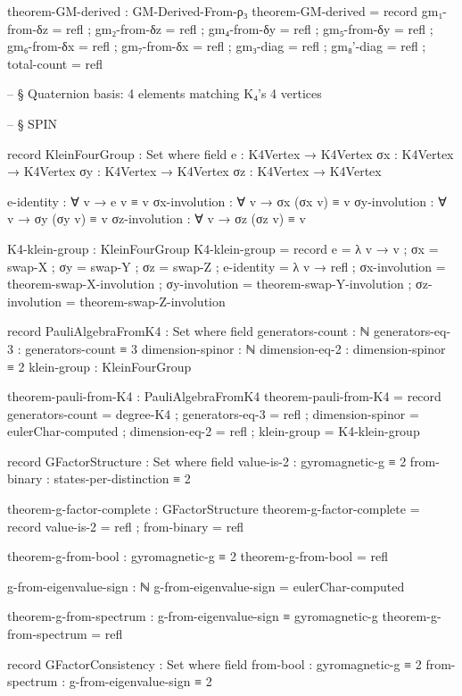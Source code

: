 \documentclass[11pt,a4paper]{book}
\begin{document}
\begin{code}
theorem-GM-derived : GM-Derived-From-ρ₃
theorem-GM-derived = record
  { gm₁-from-δz  = refl
  ; gm₂-from-δz  = refl
  ; gm₄-from-δy  = refl
  ; gm₅-from-δy  = refl
  ; gm₆-from-δx  = refl
  ; gm₇-from-δx  = refl
  ; gm₃-diag     = refl
  ; gm₈'-diag    = refl
  ; total-count   = refl
  }

-- § Quaternion basis: 4 elements matching K₄'s 4 vertices


-- § SPIN

record KleinFourGroup : Set where
  field
    e  : K4Vertex → K4Vertex
    σx : K4Vertex → K4Vertex
    σy : K4Vertex → K4Vertex
    σz : K4Vertex → K4Vertex
    
    e-identity : ∀ v → e v ≡ v
    σx-involution : ∀ v → σx (σx v) ≡ v
    σy-involution : ∀ v → σy (σy v) ≡ v
    σz-involution : ∀ v → σz (σz v) ≡ v

K4-klein-group : KleinFourGroup
K4-klein-group = record
  { e  = λ v → v
  ; σx = swap-X
  ; σy = swap-Y
  ; σz = swap-Z
  ; e-identity = λ v → refl
  ; σx-involution = theorem-swap-X-involution
  ; σy-involution = theorem-swap-Y-involution
  ; σz-involution = theorem-swap-Z-involution
  }

record PauliAlgebraFromK4 : Set where
  field
    generators-count : ℕ
    generators-eq-3  : generators-count ≡ 3
    dimension-spinor : ℕ
    dimension-eq-2   : dimension-spinor ≡ 2
    klein-group      : KleinFourGroup

theorem-pauli-from-K4 : PauliAlgebraFromK4
theorem-pauli-from-K4 = record
  { generators-count = degree-K4
  ; generators-eq-3  = refl
  ; dimension-spinor = eulerChar-computed
  ; dimension-eq-2   = refl
  ; klein-group      = K4-klein-group
  }

record GFactorStructure : Set where
  field
    value-is-2 : gyromagnetic-g ≡ 2
    from-binary : states-per-distinction ≡ 2

theorem-g-factor-complete : GFactorStructure
theorem-g-factor-complete = record
  { value-is-2 = refl
  ; from-binary = refl
  }

theorem-g-from-bool : gyromagnetic-g ≡ 2
theorem-g-from-bool = refl

g-from-eigenvalue-sign : ℕ
g-from-eigenvalue-sign = eulerChar-computed

theorem-g-from-spectrum : g-from-eigenvalue-sign ≡ gyromagnetic-g
theorem-g-from-spectrum = refl

record GFactorConsistency : Set where
  field
    from-bool        : gyromagnetic-g ≡ 2
    from-spectrum    : g-from-eigenvalue-sign ≡ 2


\end{code}
\end{document}

